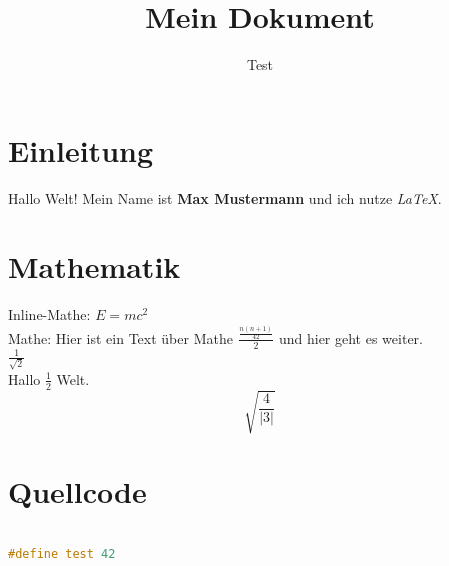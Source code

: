 \documentclass{article}
\title{Mein Dokument}
\author{Test}
\begin{document}
\maketitle

\section{Einleitung}
Hallo Welt!  
Mein Name ist \textbf{Max Mustermann} und ich nutze \textit{LaTeX}.

\section{Mathematik}
Inline-Mathe: $E = mc^2$  \\
Mathe: Hier ist ein Text über Mathe \(\frac{\frac{n(n+1)}{ 42}}{ 2}\) und hier geht es weiter.\\  



\(\frac{1}{ \sqrt{2}}\) \\



Hallo \(\frac{1}{ 2}\) Welt.  
\[\sqrt{\frac{4}{ \left|3\right|}}\]



\section{Quellcode}

\begin{lstlisting}[language=c++]

#define test 42

\end{lstlisting}
\end{document}
